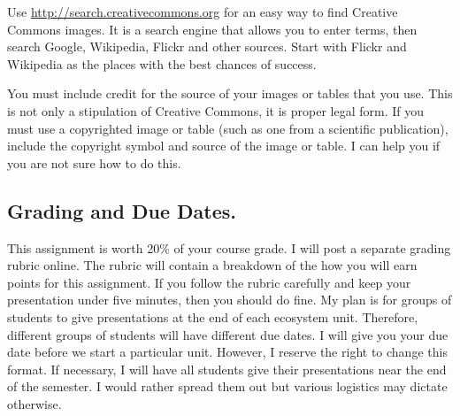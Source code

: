 \documentclass[letterpaper]{memoir}
\newcommand{\insertslide}[2]{%
  \framebox{\texttt{[image: \#2]}}
}
\begin{document}
Use \url{http://search.creativecommons.org} for an easy way to find Creative Commons images. It is a search engine that allows you to enter terms, then search Google, Wikipedia, Flickr and other sources. Start with Flickr and Wikipedia as the places with the best chances of success.

You must include credit for the source of your images or tables that you use.  This is not only a stipulation of Creative Commons, it is proper legal form. If you must use a copyrighted image or table (such as one from a scientific publication), include the copyright symbol and source of the image or table.  I can help you if you are not sure how to do this.

\subsection*{Grading and Due Dates.}

\sidepar{\insertslide{17}{5_in_5_overview.pdf}}
This assignment is worth 20\% of your course grade. I will post a separate grading rubric online. The rubric will contain a breakdown of the how you will earn points for this assignment. If you follow the rubric carefully and keep your presentation under five minutes, then you should do fine.  My plan is for groups of students to give presentations at the end of each ecosystem unit.  Therefore, different groups of students will have different due dates. I will give you your due date before we start a particular unit.  However, I reserve the right to change this format. If necessary, I will have all students give their presentations near the end of the semester. I would rather spread them out but various logistics may dictate otherwise.
\end{document}
